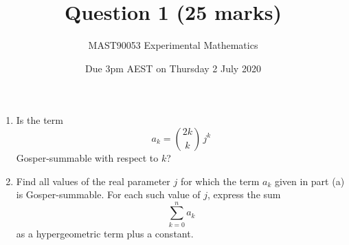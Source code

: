 \documentclass[12pt]{scrartcl}
\title{Question 1 (25 marks)}
\author{MAST90053 Experimental Mathematics}
\date{Due 3pm AEST on Thursday 2 July 2020}
\begin{document}
\thispagestyle{scrheadings}

\maketitle

  \begin{enumerate}
    \item Is the term
      \begin{equation*}
        a_k = \binom{2k}{k}\, j^k
      \end{equation*}
      Gosper-summable with respect to $k$?

    \item Find all values of the real parameter $j$ for which the term $a_k$ given in part (a) is Gosper-summable.
      For each such value of $j$, express the sum
      \begin{equation*}
        \sum_{k=0}^n a_k
      \end{equation*}
      as a hypergeometric term plus a constant.
  \end{enumerate}
\end{document}
